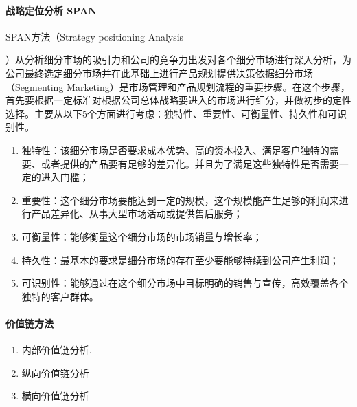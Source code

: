 \documentclass[letterpaper,10pt,english]{sphinxmanual}
\begin{document}
\paragraph{战略定位分析 SPAN}
\label{\detokenize{chapter_knowledge/BRD:span}}
SPAN方法（Strategy positioning
Analysis%
\begin{footnote}[497]\sphinxAtStartFootnote
{}
%
\end{footnote}）从分析细分市场的吸引力和公司的竞争力出发对各个细分市场进行深入分析，为公司最终选定细分市场并在此基础上进行产品规划提供决策依据细分市场（Segmenting
Marketing）是市场管理和产品规划流程的重要步骤。在这个步骤，首先要根据一定标准对根据公司总体战略要进入的市场进行细分，并做初步的定性选择。主要从以下5个方面进行考虑：独特性、重要性、可衡量性、持久性和可识别性。
\begin{enumerate}
%
\item {} 
独特性：该细分市场是否要求成本优势、高的资本投入、满足客户独特的需要、或者提供的产品要有足够的差异化。并且为了满足这些独特性是否需要一定的进入门槛；

\item {} 
重要性：这个细分市场要能达到一定的规模，这个规模能产生足够的利润来进行产品差异化、从事大型市场活动或提供售后服务；

\item {} 
可衡量性：能够衡量这个细分市场的市场销量与增长率；

\item {} 
持久性：最基本的要求是细分市场的存在至少要能够持续到公司产生利润；

\item {} 
可识别性：能够通过在这个细分市场中目标明确的销售与宣传，高效覆盖各个独特的客户群体。%
\begin{footnote}[498]\sphinxAtStartFootnote
{}
%
\end{footnote}

\end{enumerate}


\paragraph{价值链方法}
\label{\detokenize{chapter_knowledge/BRD:id17}}\begin{enumerate}
%
\item {} 
内部价值链分析.

\item {} 
纵向价值链分析

\item {} 
横向价值链分析

\end{enumerate}
\end{document}
